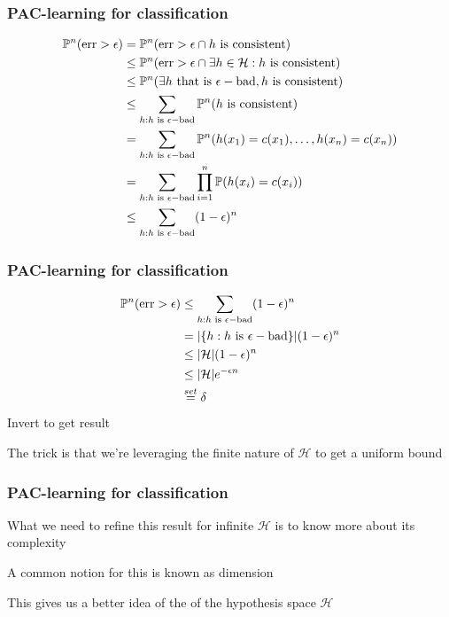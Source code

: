 \documentclass[12pt]{beamer}
\begin{document}
\begin{frame}[fragile]
\frametitle{PAC-learning for classification}
\begin{align*}
\P^n (\textrm{err} > \epsilon) 
& =
\P^n (\textrm{err} > \epsilon \cap h \textrm{ is consistent})  \\
& \leq 
\P^n (\textrm{err} > \epsilon \cap \exists h \in \mathcal{H}: h \textrm{ is consistent})  \\
& \leq 
\P^n (\exists h \textrm{ that is } \epsilon-\textrm{bad}, h \textrm{ is consistent})  \\
& \leq 
\sum_{h: h \textrm{ is } \epsilon-\textrm{bad}} \P^n (h \textrm{ is consistent})  \\
& = 
\sum_{h: h \textrm{ is } \epsilon-\textrm{bad}} \P^n (h(x_1) = c(x_1), \ldots, h(x_n) = c(x_n)) \\
& = 
\sum_{h: h \textrm{ is } \epsilon-\textrm{bad}} \prod_{i=1}^n \P (h(x_i) = c(x_i)) \\
& \leq
\sum_{h: h \textrm{ is } \epsilon-\textrm{bad}} (1-\epsilon)^n
\end{align*}
\end{frame}

\begin{frame}[fragile]
\frametitle{PAC-learning for classification}
\begin{align*}
\P^n (\textrm{err} > \epsilon) 
& \leq
\sum_{h: h \textrm{ is } \epsilon-\textrm{bad}} (1-\epsilon)^n \\
& =
|\{h: h \textrm{ is } \epsilon-\textrm{bad}\}| (1-\epsilon)^n \\
& \leq
|\mathcal{H}| (1-\epsilon)^n \\
& \leq
|\mathcal{H}| e^{-\epsilon n} \\
& \stackrel{set}{=}
\delta
\end{align*}
Invert to get result

\vsp
The trick is that we're leveraging the finite nature of $\mathcal{H}$ to get a uniform bound

\end{frame}

\begin{frame}[fragile]
\frametitle{PAC-learning for classification}
What we need to refine this result for infinite $\mathcal{H}$ is to know more about its  complexity

\vsp
A common notion for this is known as  dimension

\vsp
This gives us a better idea of the  of the hypothesis space $\mathcal{H}$
\end{frame}
\end{document}
